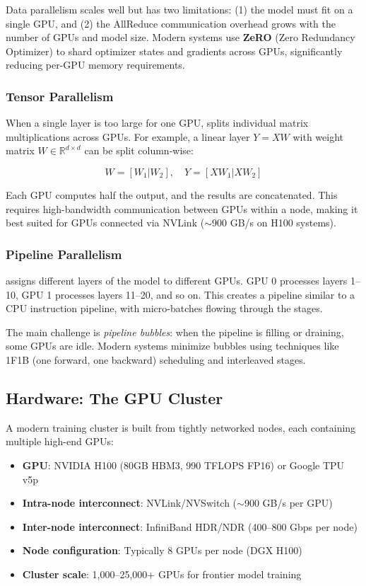 Data parallelism scales well but has two limitations: (1) the model must fit on a single GPU, and (2) the AllReduce communication overhead grows with the number of GPUs and model size. Modern systems use \textbf{ZeRO} (Zero Redundancy Optimizer) to shard optimizer states and gradients across GPUs, significantly reducing per-GPU memory requirements.

\subsubsection{Tensor Parallelism}

When a single layer is too large for one GPU,  splits individual matrix multiplications across GPUs. For example, a linear layer $Y = XW$ with weight matrix $W \in \mathbb{R}^{d \times d}$ can be split column-wise:

$$W = [W_1 | W_2], \quad Y = [XW_1 | XW_2]$$

Each GPU computes half the output, and the results are concatenated. This requires high-bandwidth communication between GPUs within a node, making it best suited for GPUs connected via NVLink ($\sim$900 GB/s on H100 systems).

\subsubsection{Pipeline Parallelism}

 assigns different layers of the model to different GPUs. GPU 0 processes layers 1--10, GPU 1 processes layers 11--20, and so on. This creates a pipeline similar to a CPU instruction pipeline, with micro-batches flowing through the stages.

The main challenge is \emph{pipeline bubbles}: when the pipeline is filling or draining, some GPUs are idle. Modern systems minimize bubbles using techniques like 1F1B (one forward, one backward) scheduling and interleaved stages.

\subsection{Hardware: The GPU Cluster}

A modern training cluster is built from tightly networked nodes, each containing multiple high-end GPUs:

\begin{itemize}[leftmargin=*]
    \item \textbf{GPU}: NVIDIA H100 (80GB HBM3, 990 TFLOPS FP16) or Google TPU v5p
    \item \textbf{Intra-node interconnect}: NVLink/NVSwitch ($\sim$900 GB/s per GPU)
    \item \textbf{Inter-node interconnect}: InfiniBand HDR/NDR (400--800 Gbps per node)
    \item \textbf{Node configuration}: Typically 8 GPUs per node (DGX H100)
    \item \textbf{Cluster scale}: 1,000--25,000+ GPUs for frontier model training
\end{itemize}

